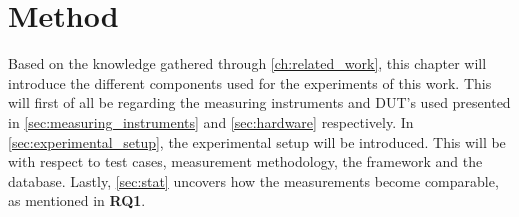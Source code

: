 \chapter{Method}\label{ch:method}

Based on the knowledge gathered through \cref{ch:related_work}, this chapter will introduce the different components used for the experiments of this work. This will first of all be regarding the measuring instruments and DUT's used presented in \cref{sec:measuring_instruments} and \cref{sec:hardware} respectively. In \cref{sec:experimental_setup}, the experimental setup will be introduced. This will be with respect to test cases, measurement methodology, the framework and the database. Lastly, \cref{sec:stat} uncovers how the measurements become comparable, as mentioned in \textbf{RQ1}.







% 
% 


